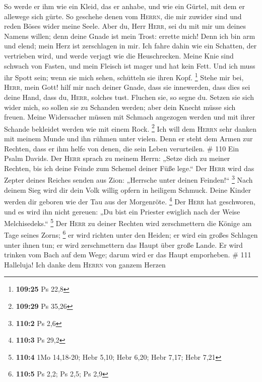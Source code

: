  So werde er ihm wie ein Kleid, das er anhabe, und wie
ein Gürtel, mit dem er allewege sich gürte.  So geschehe
denen vom \textsc{Herrn}, die mir zuwider sind und reden Böses wider
meine Seele.  Aber du, Herr \textsc{Herr}, sei du mit mir
um deines Namens willen; denn deine Gnade ist mein Trost: errette mich!
 Denn ich bin arm und elend; mein Herz ist zerschlagen in
mir.  Ich fahre dahin wie ein Schatten, der vertrieben
wird, und werde verjagt wie die Heuschrecken.  Meine Knie
sind schwach von Fasten, und mein Fleisch ist mager und hat kein Fett.
 Und ich muss ihr Spott sein; wenn sie mich sehen,
schütteln sie ihren Kopf. \footnote{\textbf{109:25} Ps 22,8}
 Stehe mir bei, \textsc{Herr}, mein Gott! hilf mir nach
deiner Gnade,  dass sie innewerden, dass dies sei deine
Hand, dass du, \textsc{Herr}, solches tust.  Fluchen sie,
so segne du. Setzen sie sich wider mich, so sollen sie zu Schanden
werden; aber dein Knecht müsse sich freuen.  Meine
Widersacher müssen mit Schmach angezogen werden und mit ihrer Schande
bekleidet werden wie mit einem Rock. \footnote{\textbf{109:29} Ps 35,26}
 Ich will dem \textsc{Herrn} sehr danken mit meinem Munde
und ihn rühmen unter vielen.  Denn er steht dem Armen zur
Rechten, dass er ihm helfe von denen, die sein Leben verurteilen. \# 110
 Ein Psalm Davids. Der \textsc{Herr} sprach zu meinem
Herrn: „Setze dich zu meiner Rechten, bis ich deine Feinde zum Schemel
deiner Füße lege.``  Der \textsc{Herr} wird das Zepter
deines Reiches senden aus Zion: „Herrsche unter deinen Feinden!{}``
\footnote{\textbf{110:2} Ps 2,6}  Nach deinem Sieg wird
dir dein Volk willig opfern in heiligem Schmuck. Deine Kinder werden dir
geboren wie der Tau aus der Morgenröte. \footnote{\textbf{110:3} Ps 29,2}
 Der \textsc{Herr} hat geschworen, und es wird ihn nicht
gereuen: „Du bist ein Priester ewiglich nach der Weise Melchisedeks.``
\footnote{\textbf{110:4} 1Mo 14,18-20; Hebr 5,10; Hebr 6,20; Hebr 7,17;
  Hebr 7,21}  Der \textsc{Herr} zu deiner Rechten wird
zerschmettern die Könige am Tage seines Zorns; \footnote{\textbf{110:5}
  Ps 2,2; Ps 2,5; Ps 2,9}  er wird richten unter den
Heiden; er wird ein großes Schlagen unter ihnen tun; er wird
zerschmettern das Haupt über große Lande.  Er wird trinken
vom Bach auf dem Wege; darum wird er das Haupt emporheben. \# 111
 Halleluja! Ich danke dem \textsc{Herrn} von ganzem Herzen
